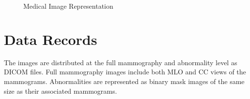 \documentclass{book}
\begin{document}
        \begin{figure}[h]
            \hfill
            \hfill
            \hfill
            \hfill
            \caption{Medical Image Representation}
        \end{figure}
         
        \section{Data Records}
        The images are distributed at the full mammography and abnormality level as DICOM files. Full mammography images include both MLO and CC views of the mammograms. Abnormalities are represented as binary mask images of the same size as their associated
        mammograms. 
\end{document}
